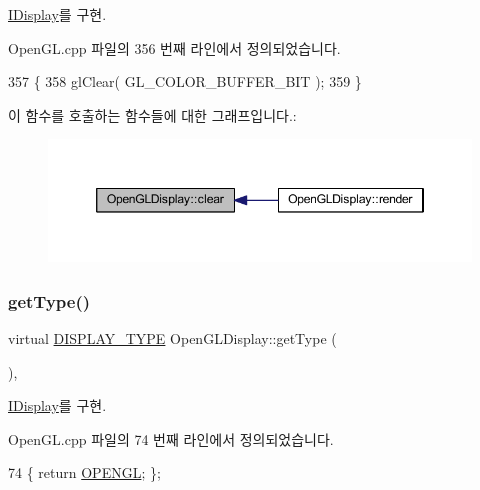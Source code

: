 \mbox{\hyperlink{class_i_display_affb8a8b5651d138058cdbd088ff3968d}{I\+Display}}를 구현.



Open\+G\+L.\+cpp 파일의 356 번째 라인에서 정의되었습니다.


\begin{DoxyCode}
357 \{
358     glClear( GL\_COLOR\_BUFFER\_BIT );
359 \}
\end{DoxyCode}
이 함수를 호출하는 함수들에 대한 그래프입니다.\+:
\nopagebreak
\begin{figure}[H]
\begin{center}
\leavevmode
\includegraphics[width=346pt]{class_open_g_l_display_abef343fb8d951b4bc63bd3b7afe285a2_icgraph}
\end{center}
\end{figure}
\mbox{\label{class_open_g_l_display_a82bec99b2136823801a0cf90813de9c2}} 
\subsubsection{\texorpdfstring{get\+Type()}{getType()}}
{\footnotesize\ttfamily virtual \mbox{\hyperlink{_display_8h_aa50f63b0688d0250e0be64d8401d09a0}{D\+I\+S\+P\+L\+A\+Y\+\_\+\+T\+Y\+PE}} Open\+G\+L\+Display\+::get\+Type (\begin{DoxyParamCaption}{ }\end{DoxyParamCaption})\hspace{0.3cm}{\ttfamily [inline]}, {\ttfamily [virtual]}}



\mbox{\hyperlink{class_i_display_a2c7fd4c6721dd8a6992b78f0c588f6f9}{I\+Display}}를 구현.



Open\+G\+L.\+cpp 파일의 74 번째 라인에서 정의되었습니다.


\begin{DoxyCode}
74 \{ \textcolor{keywordflow}{return} \mbox{\hyperlink{_display_8h_aa50f63b0688d0250e0be64d8401d09a0a4cd6ad65d345a77065fda71b3751ec24}{OPENGL}}; \};
\end{DoxyCode}
\mbox{\label{class_open_g_l_display_af0db619c7083f43e9bc61f1705843b53}} 

